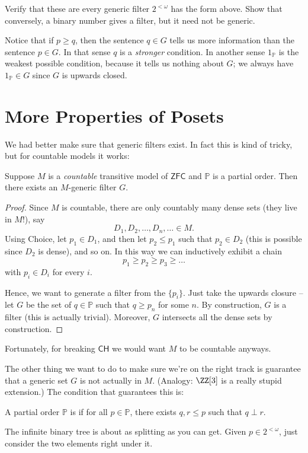 \documentclass[11pt]{scrreprt}
\newcommand{\CH}{\mathsf{CH}}
\newcommand{\ZFC}{\mathsf{ZFC}}
\newcommand{\Po}{\mathbb P}
\begin{document}
\begin{exercise}
	Verify that these are every generic filter $2^{<\omega}$ has the form above.
	Show that conversely, a binary number gives a filter, but it need not be generic.
\end{exercise}

Notice that if $p \ge q$, then the sentence $q \in G$ tells us more information than the sentence $p \in G$.
In that sense $q$ is a \emph{stronger} condition.
In another sense $1_\Po$ is the weakest possible condition,
because it tells us nothing about $G$; we always have $1_\Po \in G$
since $G$ is upwards closed.

\section{More Properties of Posets}
We had better make sure that generic filters exist.
In fact this is kind of tricky, but for countable models it works:
\begin{lemma}
	Suppose $M$ is a \emph{countable} transitive model of $\ZFC$
	and $\Po$ is a partial order.
	Then there exists an $M$-generic filter $G$.
\end{lemma}
\begin{proof}
	Since $M$ is countable, there are only countably many dense sets (they live in $M$!),
	say \[ D_1, D_2, \ldots, D_n, \ldots \in M. \]
	Using Choice,
	let $p_1 \in D_1$, and then let $p_2 \le p_1$ such that $p_2 \in D_2$
	(this is possible since $D_2$ is dense), and so on.
	In this way we can inductively exhibit a chain
	\[ p_1 \ge p_2 \ge p_3 \ge \dots \]
	with $p_i \in D_i$ for every $i$.

	Hence, we want to generate a filter from the $\{p_i\}$.
	Just take the upwards closure -- let $G$ be the set of $q \in \Po$ such that $q \ge p_n$ for some $n$.
	By construction, $G$ is a filter (this is actually trivial).
	Moreover, $G$ intersects all the dense sets by construction.
\end{proof}
Fortunately, for breaking $\CH$ we would want $M$ to be countable anyways.

The other thing we want to do to make sure we're on the right track is guarantee
that a generic set $G$ is not actually in $M$.
(Analogy: $\ZZ[3]$ is a really stupid extension.)
The condition that guarantees this is:

\begin{definition}
	A partial order $\Po$ is  if
	for all $p \in \Po$, there exists $q,r \le p$
	such that $q \perp r$.
\end{definition}
\begin{example}
	The infinite binary tree is about as splitting as you can get.
	Given $p \in 2^{<\omega}$, just consider the two elements right under it.
\end{example}
\end{document}
